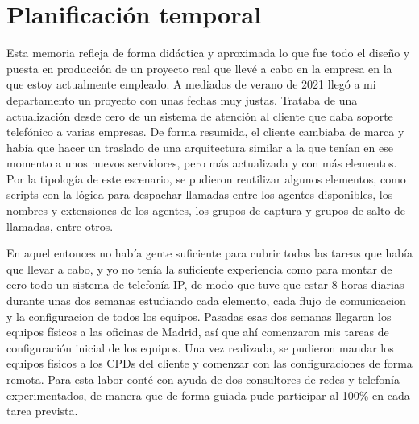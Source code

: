 \documentclass[a4paper, 12pt]{book}
\begin{document}
\section{Planificación temporal}
\label{sec:planificacion-temporal}

Esta memoria refleja de forma didáctica y aproximada lo que fue todo el diseño y puesta en producción de un proyecto real que llevé a cabo en la empresa en la que estoy actualmente empleado. 
A mediados de verano de 2021 llegó a mi departamento un proyecto con unas fechas muy justas. Trataba de una actualización desde cero de un sistema de atención al cliente que daba soporte telefónico a varias empresas. De forma resumida, el cliente cambiaba de marca y había que hacer un traslado de una arquitectura similar a la que tenían en ese momento a unos nuevos servidores, pero más actualizada y con más elementos. Por la tipología de este escenario, se pudieron reutilizar algunos elementos, como scripts con la lógica para despachar llamadas entre los agentes disponibles, los nombres y extensiones de los agentes, los grupos de captura y grupos de salto de llamadas, entre otros.

En aquel entonces no había gente suficiente para cubrir todas las tareas que había que llevar a cabo, y yo no tenía la suficiente experiencia como para montar de cero todo un sistema de telefonía IP, de modo que tuve que estar 8 horas diarias durante unas dos semanas estudiando cada elemento, cada flujo de comunicacion y la configuracion de todos los equipos. Pasadas esas dos semanas llegaron los equipos físicos a las oficinas de Madrid, así que ahí comenzaron mis tareas de configuración inicial de los equipos. 
Una vez realizada, se pudieron mandar los equipos físicos a los CPDs del cliente y comenzar con las configuraciones de forma remota. Para esta labor conté con ayuda de dos consultores de redes y telefonía experimentados, de manera que de forma guiada pude participar al 100\% en cada tarea prevista.
\end{document}
